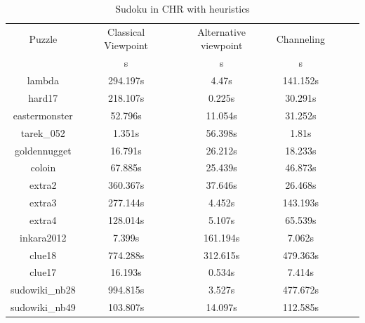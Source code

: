 \documentclass{report}
\begin{document}
\begin{table}[h!]
      \begin{tabular}{|c|c|c|c|c|c|c|}
        \hline
        \multirow{1}{*}{Puzzle} &
          \multicolumn{1}{L|}{Classical Viewpoint} &
          \multicolumn{1}{L|}{Alternative viewpoint} &
          \multicolumn{1}{L|}{Channeling} \\
        & s & s & s \\
        \hline
lambda & 294.197s & 4.47s & 141.152s \\
hard17 & 218.107s & 0.225s & 30.291s \\
eastermonster & 52.796s & 11.054s & 31.252s \\
tarek\_052 & 1.351s & 56.398s & 1.81s \\
goldennugget & 16.791s & 26.212s & 18.233s \\
coloin & 67.885s & 25.439s & 46.873s \\
extra2 & 360.367s & 37.646s & 26.468s \\
extra3 & 277.144s & 4.452s & 143.193s \\
extra4 & 128.014s & 5.107s & 65.539s \\
inkara2012 & 7.399s & 161.194s & 7.062s \\
clue18 & 774.288s & 312.615s & 479.363s \\
clue17 & 16.193s & 0.534s & 7.414s \\
sudowiki\_nb28 & 994.815s & 3.527s & 477.672s \\
sudowiki\_nb49 & 103.807s & 14.097s & 112.585s \\
 \hline
      \end{tabular}
      \caption{Sudoku in CHR with heuristics}
    \end{table}
\end{document}
